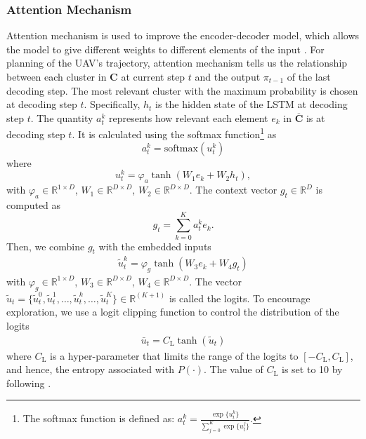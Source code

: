 \documentclass[journal]{IEEEtran}
\begin{document}
    \subsubsection{Attention Mechanism}
    Attention mechanism is used to improve the encoder-decoder model, which allows the model to give different weights to different elements of the input \cite{O. Vinyals A. Toshev}. For planning of the UAV's trajectory, attention mechanism tells us the relationship between each cluster in $\bm{C}$ at current step $t$ and the output $\pi_{t-1}$ of the last decoding step. The most relevant cluster with the maximum probability is chosen at decoding step $t$. Specifically, $h_t$ is the hidden state of the LSTM at decoding step $t$. The quantity $a_t^{k}$ represents how relevant each element $e_k$ in $\overline{\bm{C}}$ is at decoding step $t$. It is calculated using the softmax function\footnote{The softmax function is defined as: $a_t^{k} = \frac{\exp\{u_t^{k}\}}{\sum_{j=0}^K\exp\{u_t^{j}\}}$.} as
    \begin{equation}
    \label{akt}
        a_t^k = \text{softmax}\left(u_t^k\right)
    \end{equation}
    where
    \begin{equation}
    \label{u_k}
        u_t^k = \varphi_a \tanh\left(W_1 e_k + W_2 h_t\right),
    \end{equation}
    with $\varphi_a\in \mathbb{R}^{1\times D}$, $W_1\in \mathbb{R}^{D \times D}$, $W_2\in \mathbb{R}^{D \times D}$.
    The context vector $g_t\in \mathbb{R}^D$ is computed as
    \begin{equation}
        g_t = \sum_{k=0}^{K} a_t^k e_{k}.
    \end{equation}
	Then, we combine $g_t$ with the embedded inputs
	\begin{align}
	   \label{ukt}
	   \widetilde{u}_t^k = \varphi_g\tanh{}\left(W_3 e_k + W_4 g_t\right)
	\end{align}
	with $\varphi_g\in \mathbb{R}^{1 \times D}$, $W_3\in \mathbb{R}^{D \times D}$, $W_4\in \mathbb{R}^{D \times D}$. The vector $\widetilde{u}_t = \{\widetilde{u}_t^0, \widetilde{u}_t^1, \dots, \widetilde{u}_t^k, \dots, \widetilde{u}_t^K \} \in \mathbb{R}^{(K+1)}$ is called the logits. To encourage exploration, we use a logit clipping function to control the distribution of the logits
	\begin{align}
	    \bar{u}_t = C_{\text{L}}\tanh{(\widetilde{u}_t)}
	\end{align}
	where $C_{\text{L}}$ is a hyper-parameter that limits the range of the logits to $[-C_{\text{L}}, C_{\text{L}}]$, and hence, the entropy associated with $P(\cdot)$. The  value of $C_{\text{L}}$ is set to 10 by following \cite{I. Bello}.
\end{document}
